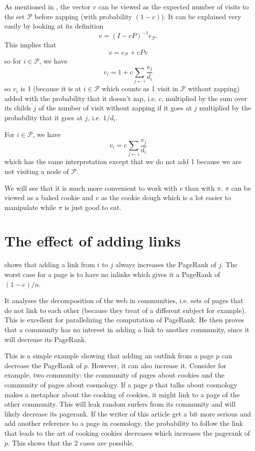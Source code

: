 \documentclass{article}
\newcommand{\1}{\mathbf{1}}
\theoremstyle{definition}
\begin{document}
As mentioned in \cite{de2008maximizing}, the vector $v$ can be viewed as the expected number of visits to the set $\mathcal{P}$ before zapping (with probability $(1-c)$).
It can be explained very easily by looking at its definition
\[ v = (I - cP)^{-1} e_{\mathcal{P}}. \]
This implies that
\[ v = e_{\mathcal{P}} + cPv \]
so for $i \in \mathcal{P}$, we have
\[ v_i = 1 + c \sum_{j \leftarrow i} \frac{v_j}{d_i} \]
so $v_i$ is 1 (because it is at $i \in \mathcal{P}$ which counts as 1 visit in $\mathcal{P}$ without zapping)
added with the probability that it doesn't zap, i.e. $c$, multiplied by the sum over its childs $j$ of the number of visit without zapping if it goes at $j$ multiplied
by the probability that it goes at $j$, i.e. $1/d_i$.

For $i \in \mathcal{P}$, we have
\[ v_i = c \sum_{j \leftarrow i} \frac{v_j}{d_i} \]
which has the same interpretation except that we do not add 1 because we are not visiting a node of $\mathcal{P}$.

We will see that it is much more convenient to work with $v$ than with $\pi$.
$\pi$ can be viewed as a baked cookie and $v$ as the cookie dough which is a lot easier to manipulate
while $\pi$ is just good to eat.

\section{The effect of adding links}
\cite{avrachenkov2004decomposition} shows that adding a link
from $i$ to $j$ always increases the PageRank of $j$.
The worst case for a page is to have no inlinks which gives it a PageRank of $(1-c)/n$.

It analyses the decomposition of the web in communities, i.e.
sets of pages that do not link to each other (because they treat of a different subject for example).
This is excellent for parallelizing the computation of PageRank.
He then proves that a community has no interest in adding a link to another community, since it will decrease its PageRank.

This is a simple example showing that adding an outlink from a page $p$ can decrease the PageRank of $p$.
However, it can also increase it.
Consider for example, two community: the community of pages about cookies and the community of pages about cosmology.
If a page $p$ that talks about cosmology makes a metaphor about the cooking of cookies, it might link to a page of the other community.
This will leak random surfers from its community and will likely decrease its pagerank.
If the writer of this article get a bit more serious and add another reference to a page in cosmology, the probability to follow the link that leads to the art of cooking cookies decreases which increases the pagerank of $p$.
This shows that the 2 cases are possible.
\end{document}
